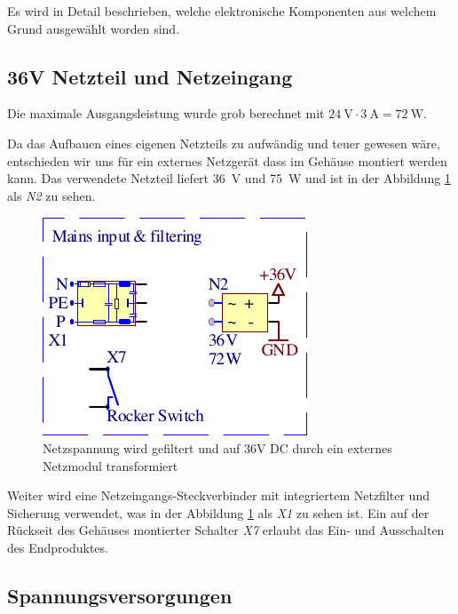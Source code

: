 Es wird  in  Detail  beschrieben,  welche  elektronische Komponenten aus welchem
Grund ausgew\"ahlt worden sind.

\subsection{36V Netzteil und Netzeingang}

Die  maximale Ausgangsleistung wurde grob berechnet  mit  $\SI{24}{\volt}  \cdot
\SI{3}{\ampere} = \SI{72}{\watt}$.

Da das Aufbauen eines eigenen Netzteils zu aufw\"andig und teuer gewesen w\"are,
entschieden wir uns f\"ur  ein  externes  Netzger\"at dass im Geh\"ause montiert
werden kann. Das verwendete Netzteil  liefert  \SI{36}{\volt} und \SI{75}{\watt}
und ist in der Abbildung  \ref{fig:circuit:mains-input}  als \emph{N2} zu sehen.

\begin{figure}[th!]
    \center
    \includegraphics[width=.35\textwidth]{images/circuit/mains-input.pdf}
    \caption{Netzspannung wird gefiltert und auf 36V DC durch ein externes Netzmodul transformiert}
    \label{fig:circuit:mains-input}
\end{figure}

Weiter  wird eine Netzeingangs-Steckverbinder mit  integriertem  Netzfilter  und
Sicherung  verwendet,  was  in  der Abbildung \ref{fig:circuit:mains-input}  als
\emph{X1}  zu  sehen ist. Ein  auf  der  R\"uckseit  des  Geh\"auses  montierter
Schalter  \emph{X7}  erlaubt  das  Ein-  und   Ausschalten   des   Endproduktes.

\subsection{Spannungsversorgungen}

